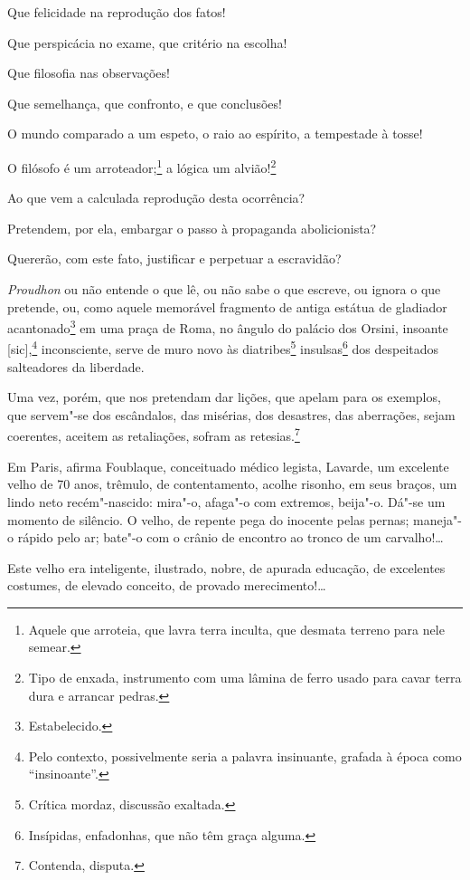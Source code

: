 \asterisc

Que felicidade na reprodução dos fatos!

Que perspicácia no exame, que critério na escolha!

Que filosofia nas observações!

Que semelhança, que confronto, e que conclusões!

O mundo comparado a um espeto, o raio ao espírito, a tempestade à tosse!

O filósofo é um arroteador;\footnote{Aquele que arroteia, que lavra
  terra inculta, que desmata terreno para nele semear.} a lógica um
alvião!\footnote{Tipo de enxada, instrumento com uma lâmina de ferro
  usado para cavar terra dura e arrancar pedras.}

Ao que vem a calculada reprodução desta ocorrência?

Pretendem, por ela, embargar o passo à propaganda abolicionista?

Quererão, com este fato, justificar e perpetuar a escravidão?

\emph{Proudhon} ou não entende o que lê, ou não sabe o que escreve, ou
ignora o que pretende, ou, como aquele memorável fragmento de antiga
estátua de gladiador acantonado\footnote{Estabelecido.} em uma praça
de Roma, no ângulo do palácio dos Orsini, insoante {[}sic{]},\footnote{
  Pelo contexto, possivelmente seria a palavra insinuante, grafada à
  época como ``insinoante''.} inconsciente, serve de muro novo às
diatribes\footnote{Crítica mordaz, discussão exaltada.}
insulsas\footnote{Insípidas, enfadonhas, que não têm graça alguma.}
dos despeitados salteadores da liberdade.

Uma vez, porém, que nos pretendam dar lições, que apelam para os
exemplos, que servem"-se dos escândalos, das misérias, dos desastres, das
aberrações, sejam coerentes, aceitem as retaliações, sofram as
retesias.\footnote{Contenda, disputa.}

\asterisc

Em Paris, afirma Foublaque, conceituado médico legista, Lavarde, um
excelente velho de 70 anos, trêmulo, de contentamento, acolhe risonho,
em seus braços, um lindo neto recém"-nascido: mira"-o, afaga"-o com
extremos, beija"-o. Dá"-se um momento de silêncio. O velho, de repente
pega do inocente pelas pernas; maneja"-o rápido pelo ar; bate"-o com o
crânio de encontro ao tronco de um carvalho!\ldots{}

Este velho era inteligente, ilustrado, nobre, de apurada educação, de
excelentes costumes, de elevado conceito, de provado merecimento!\ldots{}

